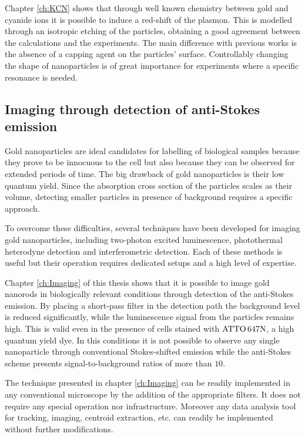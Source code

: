 Chapter \ref{ch:KCN} shows that through well known chemistry between gold and
cyanide ions it is possible to induce a red-shift of the plasmon. This is
modelled through an isotropic etching of the particles, obtaining a good
agreement between the calculations and the experiments. The main difference with
previous works is the absence of a capping agent on the particles' surface.
Controllably changing the shape of nanoparticles is of great importance for
experiments where a specific resonance is needed. 

\subsection{Imaging through detection of anti-Stokes emission}
Gold nanoparticles are ideal candidates for labelling of biological samples
because they prove to be innocuous to the cell\cite{Lewinski2008} but also
because they can be observed for extended periods of
time\cite{PEREZJUSTE2005,Mohamed2000}. The big drawback of gold nanoparticles is
their low quantum yield. Since the absorption cross section of the particles
scales as their volume, detecting smaller particles in presence of background
requires a specific approach.

To overcome these difficulties, several techniques have been developed for
imaging gold nanoparticles, including two-photon excited
luminescence\cite{VandenBroek2013}, photothermal \mbox{heterodyne}
detection\cite{Berciaud2006} and interferometric detection\cite{Ignatovich2006}.
Each of these methods is useful but their operation requires dedicated setups
and a high level of expertise.

Chapter \ref{ch:Imaging} of this thesis shows that it is possible to image gold
nanorods in biologically relevant conditions through detection of the
anti-Stokes emission. By placing a short-pass filter in the detection path the
background level is reduced significantly, while the luminescence signal from
the particles remains high. This is valid even in the presence of cells stained
with $\textrm{ATTO}\,647\textrm{N}$, a high quantum yield dye. In this conditions it is not possible to
observe any single nanoparticle through conventional Stokes-shifted emission 
while the anti-Stokes scheme presents signal-to-background ratios of more than
$10$.

The technique presented in chapter \ref{ch:Imaging} can be readily implemented
in any conventional microscope by the addition of the appropriate filters. It
does not require any special operation nor infrastructure. Moreover any data
analysis tool for tracking, imaging, centroid extraction, etc. can readily be
implemented without further modifications. 

